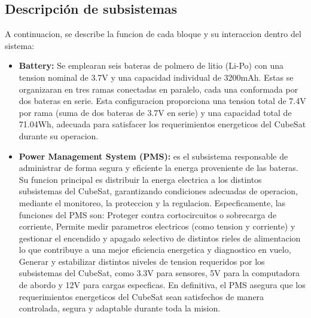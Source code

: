   \subsection{Descripción de subsistemas}
    A continuacion, se describe la funcion de cada bloque y su interaccion dentro del sistema:
    \begin{itemize}
      \item \textbf{Battery:} Se emplearan seis bateras de polmero de litio (Li-Po) con una tension nominal de 3.7V
      y una capacidad individual de 3200mAh. Estas se organizaran en tres ramas
      conectadas en paralelo, cada una conformada por dos bateras en serie. Esta configuracion proporciona una tension total de 7.4V por rama (suma de dos bateras de 3.7V en
      serie) y una capacidad total de 71.04Wh, adecuada para satisfacer los requerimientos
      energeticos del CubeSat durante su operacion.

      \item \textbf{Power Management System (PMS):} es el subsistema responsable de administrar
      de forma segura y eficiente la energa proveniente de las bateras. Su funcion principal es
      distribuir la energa electrica a los distintos subsistemas del CubeSat, garantizando condiciones adecuadas de operacion, mediante el monitoreo, la proteccion y la regulacion.
      Especficamente, las funciones del PMS son:
      Proteger contra cortocircuitos o sobrecarga de corriente,
      Permite medir parametros electricos (como tension y corriente) y gestionar el
      encendido y apagado selectivo de distintos rieles de alimentacion lo que contribuye
      a una mejor eficiencia energetica y diagnostico en vuelo,
      Generar y estabilizar distintos niveles de tension requeridos por los subsistemas
      del CubeSat, como 3.3V para sensores, 5V para la computadora de abordo y 12V
      para cargas especficas.
      En definitiva, el PMS asegura que los requerimientos energeticos del CubeSat sean
      satisfechos de manera controlada, segura y adaptable durante toda la mision.


\end{itemize}
